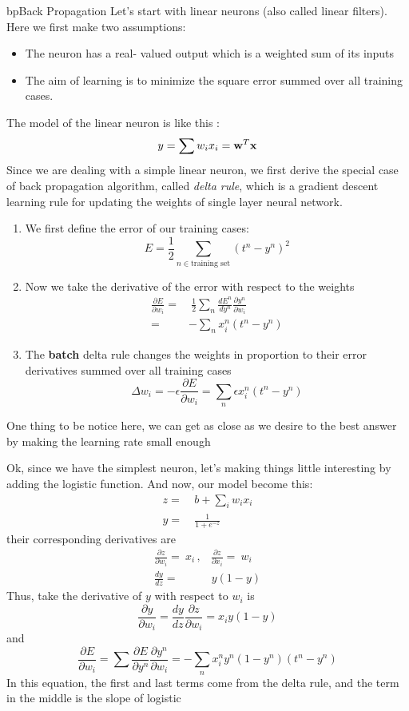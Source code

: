 \documentclass[9pt]{article}
\begin{document}
\begin{topic}{bp}{Back Propagation}
Let's start with linear neurons (also called linear filters). Here we first make two assumptions:
\begin{itemize}
\item The neuron has a real- valued output which is a weighted sum of its inputs
\item The aim of learning is to minimize the square error summed over all training cases.
\end{itemize}  
The model of the linear neuron is like this :
\[
y = \sum w_i x_i = \mathbf{w}^T\mathbf{x}
\]
Since we are dealing with a simple linear neuron, we first derive the special case of back propagation algorithm, called \textit{delta rule}, which is a gradient descent learning rule for updating the weights of single layer neural network.
\begin{enumerate}
\item We first define the error of our training cases:
\[
	E = \frac{1}{2} \sum_{n \in \text{training set}} (t^n-y^n)^2
\]
\item Now we take the derivative of the error with respect to the weights
\[
\begin{split}
	\frac{\partial E}{\partial w_i} = &\ \frac{1}{2}\sum_n \frac{dE^n}{dy^n}\frac{\partial y^n}{\partial w_i} \\
	= & - \sum_n x_i^n (t^n-y^n)
\end{split}
\]
\item The \textbf{batch} delta rule changes the weights in proportion to their error derivatives summed over all training cases
\[
	\Delta w_i = - \epsilon \frac{\partial E}{\partial w_i} = \sum_n \epsilon x_i^n (t^n-y^n)
\]
\end{enumerate}

One thing to be notice here, we can get as close as we desire to the best answer by making the learning rate small enough

Ok, since we have the simplest neuron, let's making things little interesting by adding the logistic function. And now, our model become this:
\[
\begin{split}
z = &\ b + \sum_i w_i x_i\\
y = &\ \frac{1}{1+e^{-z}}
\end{split}
\]
their corresponding derivatives are 
\[
\begin{split}
\frac{\partial z}{\partial w_i} = \ x_i  \,\text{,}&\, \frac{\partial z}{\partial x_i} = \ w_i \\
\frac{dy}{dz} = &\ y(1-y)
\end{split}
\]
Thus, take the derivative of $y$ with respect to $w_i$ is
\[
\frac{\partial y}{\partial w_i} = \frac{dy}{dz} \frac{\partial z}{\partial w_i} = x_i y (1-y)
\]
and 
\[
\frac{\partial E}{\partial w_i} = \sum \frac{\partial E}{\partial y^n} \frac{\partial y^n}{\partial w_i} = -\sum_n x_i^n y^n(1-y^n)(t^n-y^n)
\]
In this equation, the first and last terms come from the delta rule, and the term in the middle is the slope of logistic

\Working
\end{topic}
\end{document}
